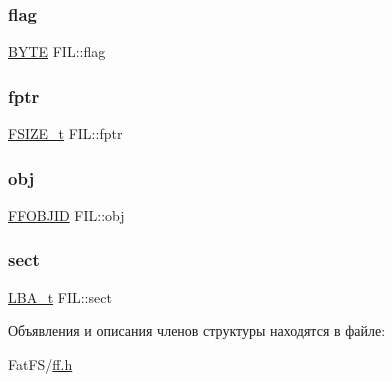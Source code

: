 \mbox{\label{struct_f_i_l_ac409508881f5a16f2998ae675072b376}} 
\subsubsection{\texorpdfstring{flag}{flag}}
{\footnotesize\ttfamily \mbox{\hyperlink{ff_8h_a4ae1dab0fb4b072a66584546209e7d58}{B\+Y\+TE}} F\+I\+L\+::flag}

\mbox{\label{struct_f_i_l_a088b03ab2e02f82e10e17bdd938190a6}} 
\subsubsection{\texorpdfstring{fptr}{fptr}}
{\footnotesize\ttfamily \mbox{\hyperlink{ff_8h_a3fc0992ad7436250b6b1a0592214b7f2}{F\+S\+I\+Z\+E\+\_\+t}} F\+I\+L\+::fptr}

\mbox{\label{struct_f_i_l_ad95b6e85106673b0d7a1855da4d264f4}} 
\subsubsection{\texorpdfstring{obj}{obj}}
{\footnotesize\ttfamily \mbox{\hyperlink{struct_f_f_o_b_j_i_d}{F\+F\+O\+B\+J\+ID}} F\+I\+L\+::obj}

\mbox{\label{struct_f_i_l_aa3f9f9ed9341b765862d073a95c86001}} 
\subsubsection{\texorpdfstring{sect}{sect}}
{\footnotesize\ttfamily \mbox{\hyperlink{ff_8h_a1f3c30a83148a28340f009d4e583f087}{L\+B\+A\+\_\+t}} F\+I\+L\+::sect}



Объявления и описания членов структуры находятся в файле\+:\begin{DoxyCompactItemize}
\item 
Fat\+F\+S/\mbox{\hyperlink{ff_8h}{ff.\+h}}\end{DoxyCompactItemize}
